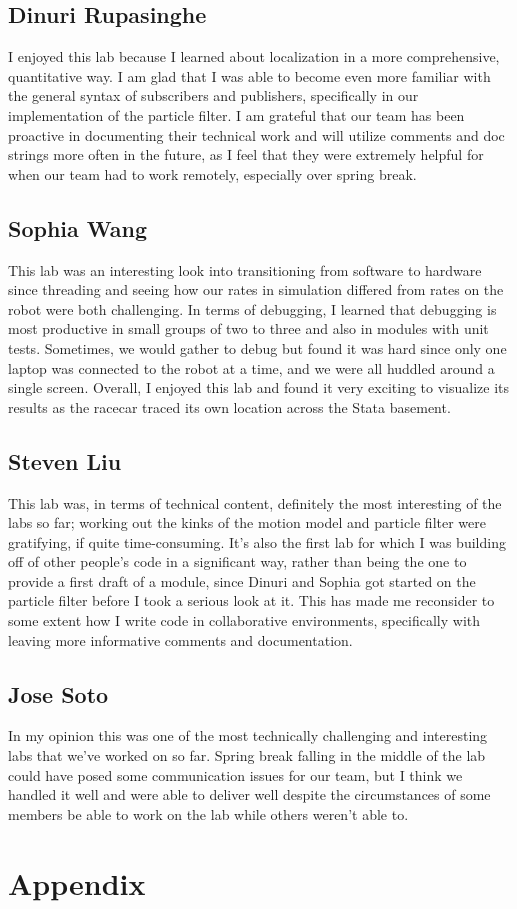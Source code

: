 \documentclass{article}
\begin{document}
\subsection{Dinuri Rupasinghe}
I enjoyed this lab because I learned about localization in a more comprehensive, quantitative way. I am glad that I was able to become even more familiar with the general syntax of subscribers and publishers, specifically in our implementation of the particle filter. I am grateful that our team has been proactive in documenting their technical work and will utilize comments and doc strings more often in the future, as I feel that they were extremely helpful for when our team had to work remotely, especially over spring break.

\subsection{Sophia Wang}
This lab was an interesting look into transitioning from software to hardware since threading and seeing how our rates in simulation differed from rates on the robot were both challenging. In terms of debugging, I learned that debugging is most productive in small groups of two to three and also in modules with unit tests. Sometimes, we would gather to debug but found it was hard since only one laptop was connected to the robot at a time, and we were all huddled around a single screen. Overall, I enjoyed this lab and found it very exciting to visualize its results as the racecar traced its own location across the Stata basement.

\subsection{Steven Liu}
This lab was, in terms of technical content, definitely the most interesting of the labs so far; working out the kinks of the motion model and particle filter were gratifying, if quite time-consuming. It's also the first lab for which I was building off of other people's code in a significant way, rather than being the one to provide a first draft of a module, since Dinuri and Sophia got started on the particle filter before I took a serious look at it. This has made me reconsider to some extent how I write code in collaborative environments, specifically with leaving more informative comments and documentation.

\subsection{Jose Soto}
In my opinion this was one of the most technically challenging and interesting labs that we've worked on so far. Spring break falling in the middle of the lab could have posed some communication issues for our team, but I think we handled it well and were able to deliver well despite the circumstances of some members be able to work on the lab while others weren't able to. 
\newpage 
\section{Appendix}
\end{document}
